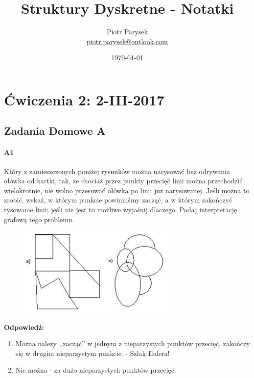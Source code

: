 \documentclass[a4paper,12pt]{article}
\title{Struktury Dyskretne - Notatki}
\author{Piotr Parysek\\
\href{mailto:piotr.parysek@outlook.com}{piotr.parysek@outlook.com} }
\date{\today}
\theoremstyle{definition}%
\theoremstyle{definition}
\theoremstyle{problem}
\begin{document}
\maketitle

\tableofcontents
\section{Ćwiczenia 2: 2-III-2017}
\subsection{Zadania Domowe A}
\paragraph{A1}  Który  z  zamieszczonych  poniżej  rysunków  można narysować  bez  odrywania  ołówka  od  kartki, tak,  że chociaż  przez punkty przecięć linii można przechodzić wielokrotnie,  nie wolno  przesuwać  ołówka  po linii  już narysowanej. Jeśli można to zrobić, wskaż,  w którym punkcie  powinniśmy  zacząć,  a  w  którym  zakończyć rysowanie   linii;   jeśli   nie   jest   to   możliwe   wyjaśnij dlaczego.  Podaj  interpretację  grafową   tego problemu.
\begin{figure}[H]
\includegraphics{img/g1}
\end{figure}
\textbf{Odpowiedź:}
\begin{enumerate}[label=\alph*)]
\item Można należy ,,zacząć'' w jednym z nieparzystych punktów przecięć, zakończy się w drugim nieparzystym punkcie. - Szlak Eulera!
\item Nie można - za dużo nieparzystych punktów przecięć.
\end{enumerate}
\end{document}
